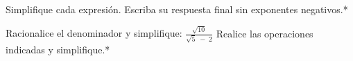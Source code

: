 \documentclass{exam}[letterpaper,10pt]
\begin{document}
\begin{multicols}{2}
\begin{questions}
    \question \textnormal{Simplifique cada expresi\'on. Escriba su respuesta final sin exponentes negativos.*}
    \question \textnormal{Racionalice el denominador y simplifique: \(\displaystyle\frac{\displaystyle\sqrt{10}}{\displaystyle\sqrt{5}\;-\;2}\)}
    \question \textnormal{Realice las operaciones indicadas y simplifique.*}
    \begin{parts}

\end{parts}
\end{questions}
\end{multicols}
\end{document}
